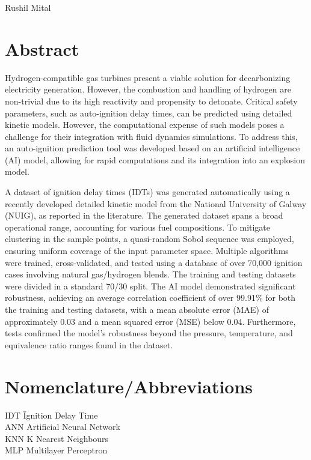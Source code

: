 \documentclass[12pt]{report}
\begin{document}
\vspace{1cm}
\begin{flushright}
Rushil Mital
\end{flushright}
\newpage
\section*{\centering Abstract}
Hydrogen-compatible gas turbines present a viable solution for decarbonizing electricity generation. However, the combustion and handling of hydrogen are non-trivial due to its high reactivity and propensity to detonate. Critical safety parameters, such as auto-ignition delay times, can be predicted using detailed kinetic models. However, the computational expense of such models poses a challenge for their integration with fluid dynamics simulations. To address this, an auto-ignition prediction tool was developed based on an artificial intelligence (AI) model, allowing for rapid computations and its integration into an explosion model. 

A dataset of ignition delay times (IDTs) was generated automatically using a recently developed detailed kinetic model from the National University of Galway (NUIG), as reported in the literature. The generated dataset spans a broad operational range, accounting for various fuel compositions. To mitigate clustering in the sample points, a quasi-random Sobol sequence was employed, ensuring uniform coverage of the input parameter space. Multiple algorithms were trained, cross-validated, and tested using a database of over 70,000 ignition cases involving natural gas/hydrogen blends. The training and testing datasets were divided in a standard 70/30 split. The AI model demonstrated significant robustness, achieving an average correlation coefficient of over 99.91\% for both the training and testing datasets, with a mean absolute error (MAE) of approximately 0.03 and a mean squared error (MSE) below 0.04. Furthermore, tests confirmed the model's robustness beyond the pressure, temperature, and equivalence ratio ranges found in the dataset.




\tableofcontents
\listoffigures


\section*{Nomenclature/Abbreviations}
\begin{tabbing}
    IDT \hspace{1cm} \= Ignition Delay Time \\
    ANN \> Artificial Neural Network\\
    KNN \> K Nearest Neighbours\\
    MLP \> Multilayer Perceptron
\end{tabbing}
\end{document}
